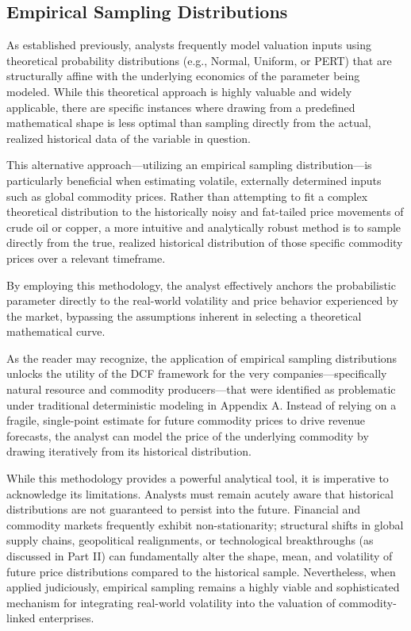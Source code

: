 \subsection*{Empirical Sampling Distributions}

As established previously, analysts frequently model valuation inputs using theoretical probability distributions (e.g., Normal, Uniform, or PERT) that are structurally affine with the underlying economics of the parameter being modeled. While this theoretical approach is highly valuable and widely applicable, there are specific instances where drawing from a predefined mathematical shape is less optimal than sampling directly from the actual, realized historical data of the variable in question.

This alternative approach—utilizing an empirical sampling distribution—is particularly beneficial when estimating volatile, externally determined inputs such as global commodity prices. Rather than attempting to fit a complex theoretical distribution to the historically noisy and fat-tailed price movements of crude oil or copper, a more intuitive and analytically robust method is to sample directly from the true, realized historical distribution of those specific commodity prices over a relevant timeframe.

By employing this methodology, the analyst effectively anchors the probabilistic parameter directly to the real-world volatility and price behavior experienced by the market, bypassing the assumptions inherent in selecting a theoretical mathematical curve.

As the reader may recognize, the application of empirical sampling distributions unlocks the utility of the DCF framework for the very companies—specifically natural resource and commodity producers—that were identified as problematic under traditional deterministic modeling in Appendix A. Instead of relying on a fragile, single-point estimate for future commodity prices to drive revenue forecasts, the analyst can model the price of the underlying commodity by drawing iteratively from its historical distribution.

While this methodology provides a powerful analytical tool, it is imperative to acknowledge its limitations. Analysts must remain acutely aware that historical distributions are not guaranteed to persist into the future. Financial and commodity markets frequently exhibit non-stationarity; structural shifts in global supply chains, geopolitical realignments, or technological breakthroughs (as discussed in Part II) can fundamentally alter the shape, mean, and volatility of future price distributions compared to the historical sample. Nevertheless, when applied judiciously, empirical sampling remains a highly viable and sophisticated mechanism for integrating real-world volatility into the valuation of commodity-linked enterprises.

